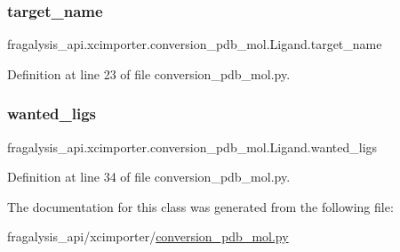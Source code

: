 \subsubsection{\texorpdfstring{target\+\_\+name}{target\_name}}
{\footnotesize\ttfamily fragalysis\+\_\+api.\+xcimporter.\+conversion\+\_\+pdb\+\_\+mol.\+Ligand.\+target\+\_\+name}



Definition at line 23 of file conversion\+\_\+pdb\+\_\+mol.\+py.

\mbox{\label{classfragalysis__api_1_1xcimporter_1_1conversion__pdb__mol_1_1_ligand_ae4f4ee5bf6c21bd59c1e52da2b4f67b5}} 
\subsubsection{\texorpdfstring{wanted\+\_\+ligs}{wanted\_ligs}}
{\footnotesize\ttfamily fragalysis\+\_\+api.\+xcimporter.\+conversion\+\_\+pdb\+\_\+mol.\+Ligand.\+wanted\+\_\+ligs}



Definition at line 34 of file conversion\+\_\+pdb\+\_\+mol.\+py.



The documentation for this class was generated from the following file\+:\begin{DoxyCompactItemize}
\item 
fragalysis\+\_\+api/xcimporter/\hyperlink{conversion__pdb__mol_8py}{conversion\+\_\+pdb\+\_\+mol.\+py}\end{DoxyCompactItemize}
